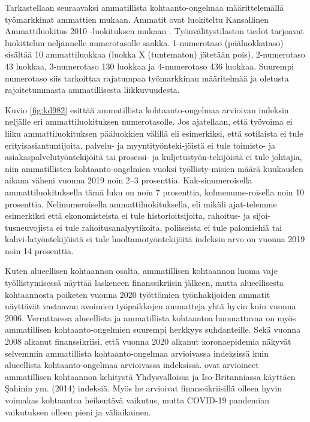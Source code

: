 \documentclass[12pt]{article}
\begin{document}
Tarkastellaan seuraavaksi ammatillista kohtaanto-ongelmaa määrittelemällä työmarkkinat ammattien mukaan. Ammatit ovat luokiteltu Kansallinen Ammattiluokitus 2010 -luokituksen mukaan \cite{tilastokeskus2011ammattiluokitus}. Työnvälitystilaston tiedot tarjoavat luokittelun neljännelle numerotasolle saakka. 1-numerotaso (pääluokkataso) sisältää 10 ammattiluokkaa (luokka X (tuntematon) jätetään pois), 2-numerotaso 43 luokkaa, 3-numerotaso 130 luokkaa ja 4-numerotaso 436 luokkaa. Suurempi numerotaso siis tarkoittaa rajatumpaa työmarkkinan määritelmää ja oletusta rajoitetummasta ammatillisesta liikkuvuudesta. 

Kuvio \ref{fig:kd982} esittää ammatillista kohtaanto-ongelmaa arvioivan indeksin neljälle eri ammattiluokituksen numerotasolle. Jos ajatellaan, että työvoima ei liiku ammattiluokituksen pääluokkien välillä eli esimerkiksi, että sotilaista ei tule erityisasiantuntijoita, palvelu- ja myyntityönteki-jöistä ei tule toimisto- ja asiakaspalvelutyöntekijöitä tai prosessi- ja kuljetustyön-tekijöistä ei tule johtajia, niin ammatillisten kohtaanto-ongelmien vuoksi työllisty-misien määrä kuukauden aikana väheni vuonna 2019 noin 2–3 prosenttia. Kak-sinumeroisella ammattiluokituksella tämä luku on noin 7 prosenttia, kolmenume-roisella noin 10 prosenttia. Nelinumeroisella ammattiluokituksella, eli mikäli ajat-telemme esimerkiksi että ekonomisteista ei tule historioitsijoita, rahoitus- ja sijoi-tusneuvojista ei tule rahoitusanalyytikoita, poliiseista ei tule palomiehiä tai kahvi-latyöntekijöistä ei tule huoltamotyöntekijöitä indeksin arvo on vuonna 2019 noin 14 prosenttia.

Kuten alueellisen kohtaannon osalta, ammatillisen kohtaannon luoma vaje työllistymisessä näyttää laskeneen finanssikriisin jälkeen, mutta alueellisesta kohtaannosta poiketen vuonna 2020 työttömien työnhakijoiden ammatit näyttävät vastaavan avoimien työpaikkojen ammatteja yhtä hyvin kuin vuonna 2006. Verrattaessa alueellista ja ammatillista kohtaantoa huomattavaa on myös ammatillisen kohtaanto-ongelmien suurempi herkkyys suhdanteille. Sekä vuonna 2008 alkanut finanssikriisi, että vuonna 2020 alkanut koronaepidemia näkyvät selvemmin ammatillista kohtaanto-ongelmaa arvioivassa indeksissä kuin alueellista kohtaanto-ongelmaa arvioivassa indeksissä.  ovat arvioineet ammatillisen kohtaannon kehitystä Yhdysvalloissa ja Iso-Britanniassa käyttäen {\c{S}}ahinin ym. (2014) indeksiä. Myös he arvioivat finanssikriisillä olleen hyvin voimakas kohtaantoa heikentävä vaikutus, mutta COVID-19 pandemian vaikutuksen olleen pieni ja väliaikainen. 
\end{document}
